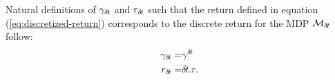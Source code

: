 Natural definitions of $\gamma_{\delta\hspace{-.1em}t}$ and $r_{\delta\hspace{-.1em}t}$ such
that the return defined in equation (\ref{eq:discretized-return}) corresponds
to the discrete return for the MDP ${\cal M}_{\delta\hspace{-.1em}t}$ follow:
\begin{align}
	\label{eq:def-gamma}
	\gamma_{\delta\hspace{-.1em}t} =& \gamma^{\delta\hspace{-.1em}t}\\
	\label{eq:def-reward}
	r_{\delta\hspace{-.1em}t} =& {\delta\hspace{-.1em}t} . r.
\end{align}





